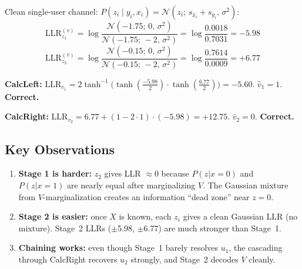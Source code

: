 \documentclass[11pt]{article}
\begin{document}
Clean single-user channel: $P(z_i \mid y_i, \hat{x}_i) = \mathcal{N}(z_i;\, s_{\hat{x}_i} + s_{y_i},\, \sigma^2)$:
\[
\text{LLR}_{z_1}^{(v)} = \log\frac{\mathcal{N}(-1.75;\, 0,\, \sigma^2)}{\mathcal{N}(-1.75;\, -2,\, \sigma^2)} = \log\frac{0.0018}{0.7031} = -5.98
\]
\[
\text{LLR}_{z_2}^{(v)} = \log\frac{\mathcal{N}(-0.15;\, 0,\, \sigma^2)}{\mathcal{N}(-0.15;\, -2,\, \sigma^2)} = \log\frac{0.7614}{0.0009} = +6.77
\]

\textbf{CalcLeft:} $\text{LLR}_{v_1} = 2\tanh^{-1}\!\bigl(\tanh(\tfrac{-5.98}{2})\cdot\tanh(\tfrac{6.77}{2})\bigr) = -5.60$. \; $\hat{v}_1 = 1$. \textbf{Correct.}

\textbf{CalcRight:} $\text{LLR}_{v_2} = 6.77 + (1-2\cdot 1)\cdot(-5.98) = +12.75$. \; $\hat{v}_2 = 0$. \textbf{Correct.}

\subsection*{Key Observations}

\begin{enumerate}[nosep]
\item \textbf{Stage 1 is harder:} $z_2$ gives LLR $\approx 0$ because $P(z|x{=}0)$ and $P(z|x{=}1)$ are nearly equal after marginalizing $V$. The Gaussian mixture from $V$-marginalization creates an information ``dead zone'' near $z = 0$.
\item \textbf{Stage 2 is easier:} once $X$ is known, each $z_i$ gives a clean Gaussian LLR (no mixture). Stage~2 LLRs ($\pm$5.98, $\pm$6.77) are much stronger than Stage~1.
\item \textbf{Chaining works:} even though Stage~1 barely resolves $u_1$, the cascading through CalcRight recovers $u_2$ strongly, and Stage~2 decodes $V$ cleanly.
\end{enumerate}
\end{document}
